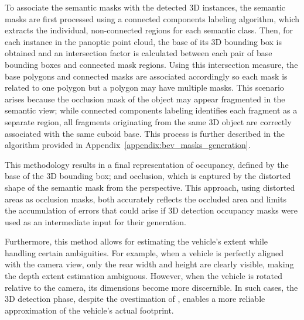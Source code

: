 To associate the  semantic masks with the detected 3D instances, the semantic masks are first processed using a connected components labeling algorithm, which extracts the individual, non-connected regions for each semantic class. Then, for each instance in the panoptic point cloud, the base of its 3D bounding box is obtained and an intersection factor is calculated between each pair of base bounding boxes and connected mask regions. Using this intersection measure, the base polygons and connected masks are associated accordingly so each mask is related to one polygon but a polygon may have multiple masks. This scenario arises because the occlusion mask of the object may appear fragmented in the  semantic view; while connected components labeling identifies each fragment as a separate region, all fragments originating from the same 3D object are correctly associated with the same cuboid base. This process is further described in the algorithm provided in Appendix~\ref{appendix:bev_masks_generation}.

This methodology results in a final representation of occupancy, defined by the base of the 3D bounding box; and occlusion, which is captured by the distorted shape of the semantic mask from the  perspective. This approach, using distorted areas as occlusion masks, both accurately reflects the occluded area and limits the accumulation of errors that could arise if 3D detection occupancy masks were used as an intermediate input for their generation.

Furthermore, this method allows for estimating the vehicle's extent while handling certain ambiguities. For example, when a vehicle is perfectly aligned with the camera view, only the rear width and height are clearly visible, making the depth extent estimation ambiguous. However, when the vehicle is rotated relative to the camera, its dimensions become more discernible. In such cases, the 3D detection phase, despite the ovestimation of , enables a more reliable approximation of the vehicle's actual footprint.

